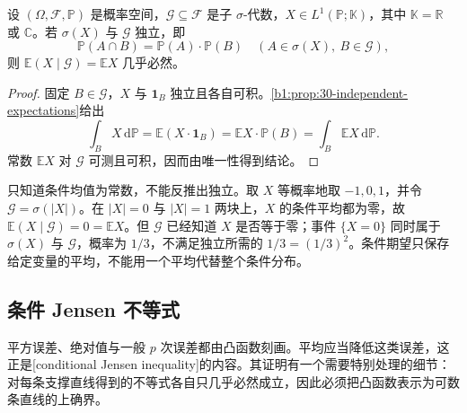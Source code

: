 \begin{proposition}[独立信息的条件期望]\label{b1:prop:conditional-expectation-independence-31}
设 \((\Omega,\mathcal F,\mathbb P)\) 是概率空间，\(\mathcal G\subseteq\mathcal F\) 是子 \(\sigma\)-代数，\(X\in L^1(\mathbb P;\mathbb K)\)，其中 \(\mathbb K=\mathbb R\) 或 \(\mathbb C\)。若 \(\sigma(X)\) 与 \(\mathcal G\) 独立，即
\[
 \mathbb P(A\cap B)=\mathbb P(A)\cdot\mathbb P(B)
 \quad(A\in\sigma(X),\ B\in\mathcal G),
\]
则 \(\mathbb E(X\mid\mathcal G)=\mathbb E X\) 几乎必然。
\end{proposition}
\begin{proof}
固定 \(B\in\mathcal G\)，\(X\) 与 \(\mathbf1_B\) 独立且各自可积。\cref{b1:prop:30-independent-expectations}给出
\[
 \int_B X\,\mathrm d\mathbb P
 =\mathbb E(X\cdot\mathbf1_B)
 =\mathbb E X\cdot\mathbb P(B)
 =\int_B\mathbb E X\,\mathrm d\mathbb P.
\]
常数 \(\mathbb E X\) 对 \(\mathcal G\) 可测且可积，因而由唯一性得到结论。
\end{proof}

只知道条件均值为常数，不能反推出独立。取 \(X\) 等概率地取 \(-1,0,1\)，并令 \(\mathcal G=\sigma(|X|)\)。在 \(|X|=0\) 与 \(|X|=1\) 两块上，\(X\) 的条件平均都为零，故 \(\mathbb E(X\mid\mathcal G)=0=\mathbb E X\)。但 \(\mathcal G\) 已经知道 \(X\) 是否等于零；事件 \(\{X=0\}\) 同时属于 \(\sigma(X)\) 与 \(\mathcal G\)，概率为 \(1/3\)，不满足独立所需的 \(1/3=(1/3)^2\)。条件期望只保存给定变量的平均，不能用一个平均代替整个条件分布。

\subsection{条件 Jensen 不等式}
\label{b1:subsec:310203}

平方误差、绝对值与一般 \(p\) 次误差都由凸函数刻画。平均应当降低这类误差，这正是[conditional Jensen inequality]的内容。其证明有一个需要特别处理的细节：对每条支撑直线得到的不等式各自只几乎必然成立，因此必须把凸函数表示为可数条直线的上确界。

